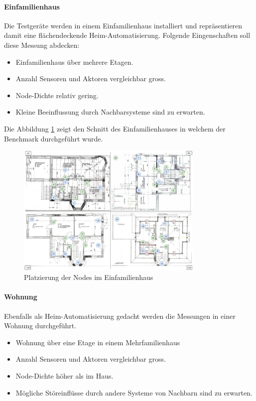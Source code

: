 \paragraph{Einfamilienhaus}
Die Testgeräte werden in einem Einfamilienhaus installiert und repräsentieren damit eine flächendeckende Heim-Automatisierung. Folgende Eingenschaften soll diese Messung abdecken:
\begin{itemize}
	\item Einfamilienhaus über mehrere Etagen.
	\item Anzahl Sensoren und Aktoren vergleichbar gross.
	\item Node-Dichte relativ gering.
	\item Kleine Beeinflussung durch Nachbarsysteme sind zu erwarten.
\end{itemize}

Die Abbildung \ref{fig:Messumgebung2Einfamilienhaus} zeigt den Schnitt des Einfamilienhauses in welchem der Benchmark durchgeführt wurde.


\begin{figure}[h]
	\centering
	\includegraphics[width=0.8\textwidth]{graphics/Plan_Haus_Raffi.png}
	\caption{Platzierung der Nodes im Einfamilienhaus}\label{fig:Messumgebung2Einfamilienhaus}
\end{figure}

\paragraph{Wohnung}
Ebenfalls als Heim-Automatisierung gedacht werden die Messungen in einer Wohnung durchgeführt.
\begin{itemize}
	\item Wohnung über eine Etage in einem Mehrfamilienhaus
	\item Anzahl Sensoren und Aktoren vergleichbar gross.
	\item Node-Dichte höher als im Haus.
	\item Mögliche Störeinflüsse durch andere Systeme von Nachbarn sind zu erwarten.
\end{itemize}

